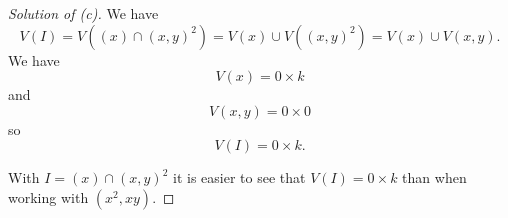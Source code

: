 \documentclass[11pt]{article}
\begin{document}
\begin{proof}[Solution of (c)]
    We have 
    \[
        V(I) = 
        V((x) \cap (x,y)^2) = 
        V(x) \cup V((x,y)^2) = 
        V(x) \cup V(x,y). 
    \]
    We have 
    \[
        V(x) = 0 \times k 
    \]
    and 
    \[
        V(x,y) = 0 \times 0
    \]
    so 
    \[
        V(I) = 0 \times k. 
    \]

    With $I = (x) \cap (x,y)^2$ it is 
    easier to see that $V(I) = 0 \times k$ than 
    when working with $(x^2,xy)$. 
\end{proof}
\end{document}
